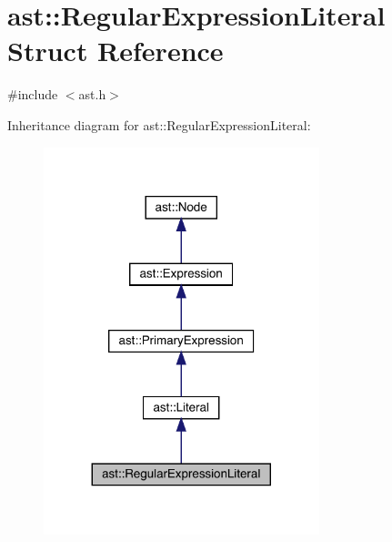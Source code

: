 \hypertarget{structast_1_1_regular_expression_literal}{}\section{ast\+:\+:Regular\+Expression\+Literal Struct Reference}
\label{structast_1_1_regular_expression_literal}


{\ttfamily \#include $<$ast.\+h$>$}



Inheritance diagram for ast\+:\+:Regular\+Expression\+Literal\+:\nopagebreak
\begin{figure}[H]
\begin{center}
\leavevmode
\includegraphics[width=227pt]{structast_1_1_regular_expression_literal__inherit__graph}
\end{center}
\end{figure}


